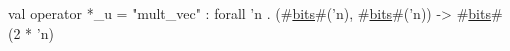 val operator *_u = "mult_vec" : forall 'n . (#\hyperref[zbits]{bits}#('n), #\hyperref[zbits]{bits}#('n)) -> #\hyperref[zbits]{bits}#(2 * 'n)
